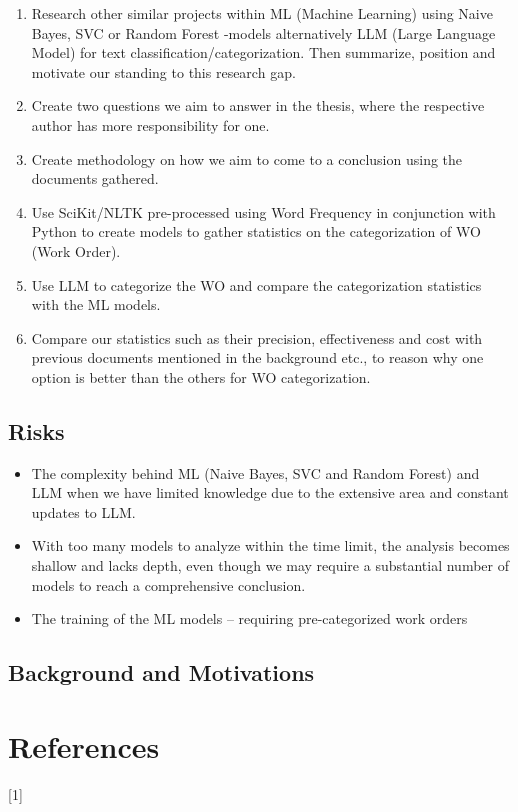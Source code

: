 \documentclass{article}
\begin{document}
\begin{enumerate}
      \item Research other similar projects within ML (Machine Learning) using Naive Bayes,
            SVC or Random Forest -models alternatively LLM (Large Language Model) for text
            classification/categorization. Then summarize, position and motivate our standing to
            this research gap.
      \item Create two questions we aim to answer in the thesis, where the respective author
            has more responsibility for one.
      \item Create methodology on how we aim to come to a conclusion using the documents gathered.
      \item Use SciKit/NLTK pre-processed using Word Frequency in conjunction with Python
            to create models to gather statistics on the categorization of WO (Work Order).
      \item Use LLM to categorize the WO and compare the categorization statistics
            with the ML models.
      \item Compare our statistics such as their precision,
            effectiveness and cost with previous documents mentioned in the background etc.,
            to reason why one option is better than the others for WO categorization.
\end{enumerate}

\subsection{Risks}

\begin{itemize}
      \item The complexity behind ML (Naive Bayes, SVC and Random Forest) and LLM when
            we have limited knowledge due to the extensive area and constant updates to LLM.
      \item With too many models to analyze within the time limit, the analysis becomes
            shallow and lacks depth, even though we may require a substantial number of models
            to reach a comprehensive conclusion.
      \item The training of the ML models -- requiring pre-categorized work orders
\end{itemize}

\subsection{Background and Motivations}

\section{References}

 [1]
\end{document}
